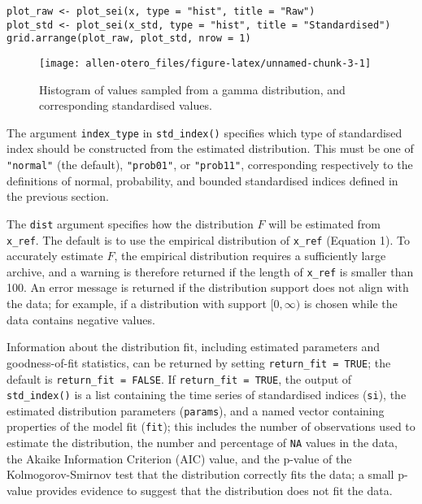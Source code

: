 \begin{verbatim}
plot_raw <- plot_sei(x, type = "hist", title = "Raw")
plot_std <- plot_sei(x_std, type = "hist", title = "Standardised")
grid.arrange(plot_raw, plot_std, nrow = 1)
\end{verbatim}

\begin{figure}

{\centering \texttt{[image: allen-otero\_files/figure-latex/unnamed-chunk-3-1]} 

}

\caption{Histogram of values sampled from a gamma distribution, and corresponding standardised values.}\label{fig:unnamed-chunk-3}
\end{figure}

The argument \texttt{index\_type} in \texttt{std\_index()} specifies which type of standardised index should be constructed from the estimated distribution. This must be one of \texttt{"normal"} (the default), \texttt{"prob01"}, or \texttt{"prob11"}, corresponding respectively to the definitions of normal, probability, and bounded standardised indices defined in the previous section.

The \texttt{dist} argument specifies how the distribution \(F\) will be estimated from \texttt{x\_ref}. The default is to use the empirical distribution of \texttt{x\_ref} (Equation 1). To accurately estimate \(F\), the empirical distribution requires a sufficiently large archive, and a warning is therefore returned if the length of \texttt{x\_ref} is smaller than 100. An error message is returned if the distribution support does not align with the data; for example, if a distribution with support \([0, \infty)\) is chosen while the data contains negative values.

Information about the distribution fit, including estimated parameters and goodness-of-fit statistics, can be returned by setting \texttt{return\_fit\ =\ TRUE}; the default is \texttt{return\_fit\ =\ FALSE}. If \texttt{return\_fit\ =\ TRUE}, the output of \texttt{std\_index()} is a list containing the time series of standardised indices (\texttt{si}), the estimated distribution parameters (\texttt{params}), and a named vector containing properties of the model fit (\texttt{fit}); this includes the number of observations used to estimate the distribution, the number and percentage of \texttt{NA} values in the data, the Akaike Information Criterion (AIC) value, and the p-value of the Kolmogorov-Smirnov test that the distribution correctly fits the data; a small p-value provides evidence to suggest that the distribution does not fit the data.

